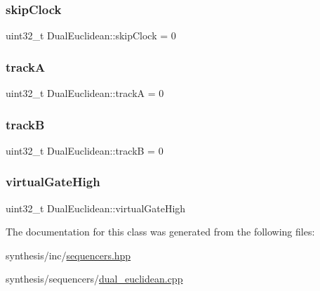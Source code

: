 \mbox{\label{class_dual_euclidean_a0cee123dd1067d2144f9c3c53e1d4707}} 
\subsubsection{\texorpdfstring{skip\+Clock}{skipClock}}
{\footnotesize\ttfamily uint32\+\_\+t Dual\+Euclidean\+::skip\+Clock = 0}

\mbox{\label{class_dual_euclidean_a9c9f254af7b89c373ce03d8b857b2477}} 
\subsubsection{\texorpdfstring{trackA}{trackA}}
{\footnotesize\ttfamily uint32\+\_\+t Dual\+Euclidean\+::trackA = 0}

\mbox{\label{class_dual_euclidean_a9c2333d598bf61280491b69b2e01e8e1}} 
\subsubsection{\texorpdfstring{trackB}{trackB}}
{\footnotesize\ttfamily uint32\+\_\+t Dual\+Euclidean\+::trackB = 0}

\mbox{\label{class_dual_euclidean_a178d24471a08efe6149529d86b05fa1d}} 
\subsubsection{\texorpdfstring{virtual\+Gate\+High}{virtualGateHigh}}
{\footnotesize\ttfamily uint32\+\_\+t Dual\+Euclidean\+::virtual\+Gate\+High}



The documentation for this class was generated from the following files\+:\begin{DoxyCompactItemize}
\item 
synthesis/inc/\mbox{\hyperlink{sequencers_8hpp}{sequencers.\+hpp}}\item 
synthesis/sequencers/\mbox{\hyperlink{dual__euclidean_8cpp}{dual\+\_\+euclidean.\+cpp}}\end{DoxyCompactItemize}

